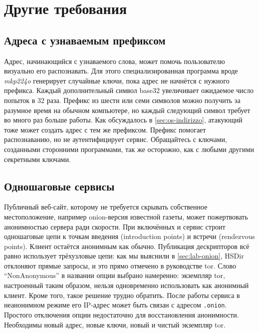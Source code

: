 \section{Другие требования}\label{sec:onionp-altre}

\subsection{Адреса с узнаваемым префиксом}

Адрес, начинающийся с узнаваемого слова, может помочь пользователю визуально его распознавать. Для этого специализированная программа вроде \emph{mkp224o} генерирует случайные ключи, пока адрес не начнётся с нужного префикса. Каждый дополнительный символ base32 увеличивает ожидаемое число попыток в 32 раза. Префикс из шести или семи символов можно получить за разумное время на обычном компьютере, но каждый следующий символ требует во много раз больше работы. Как обсуждалось в \cref{sec:os-indirizzo}, атакующий тоже может создать адрес с тем же префиксом. Префикс помогает распознаванию, но не аутентифицирует сервис. Обращайтесь с ключами, созданными сторонними программами, так же осторожно, как с любыми другими секретными ключами.

\subsection{Одношаговые сервисы}

Публичный веб-сайт, которому не требуется скрывать собственное местоположение, например onion-версия известной газеты, может пожертвовать анонимностью сервера ради скорости. При включённых  и  сервис строит одношаговые цепи к точкам введения (introduction points) и встречи (rendezvous points). Клиент остаётся анонимным как обычно. Публикация дескрипторов всё равно использует трёхузловые цепи: как мы выяснили в \cref{sec:lab-onion}, HSDir отклоняют прямые запросы, и это прямо отмечено в руководстве tor. Слово \enquote{NonAnonymous} в названии опции выбрано намеренно: экземпляр tor, настроенный таким образом, нельзя одновременно использовать как анонимный клиент. Кроме того, такое решение трудно обратить. После работы сервиса в неанонимном режиме его IP-адрес может быть связан с адресом \texttt{.onion}. Простого отключения опции недостаточно для восстановления анонимности. Необходимы новый адрес, новые ключи, новый  и чистый экземпляр tor.

